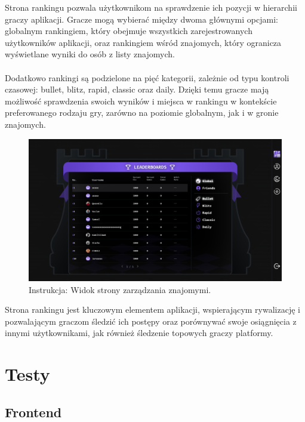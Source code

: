 \documentclass[twoside]{projektInzynierskiMS1}
\begin{document}
\noindent
Strona rankingu pozwala użytkownikom na sprawdzenie ich pozycji w hierarchii graczy aplikacji. Gracze mogą wybierać między dwoma głównymi opcjami: globalnym rankingiem, który obejmuje wszystkich zarejestrowanych użytkowników aplikacji, oraz rankingiem wśród znajomych, który ogranicza wyświetlane wyniki do osób z listy znajomych.
\\\\
Dodatkowo rankingi są podzielone na pięć kategorii, zależnie od typu kontroli czasowej: bullet, blitz, rapid, classic oraz daily. Dzięki temu gracze mają możliwość sprawdzenia swoich wyników i miejsca w rankingu w kontekście preferowanego rodzaju gry, zarówno na poziomie globalnym, jak i w gronie znajomych.

\vspace{0.5cm}
\begin{figure}[h!]
    \centering
    \includegraphics[width=1\textwidth]{images/ins_rank.png}
    \caption{Instrukcja: Widok strony zarządzania znajomymi.}
\end{figure}
\vspace{0.5cm}

\noindent
Strona rankingu jest kluczowym elementem aplikacji, wspierającym rywalizację i pozwalającym graczom śledzić ich postępy oraz porównywać swoje osiągnięcia z innymi użytkownikami, jak również śledzenie topowych graczy platformy.

\newpage

\section{Testy}

\subsection{Frontend}
\end{document}

